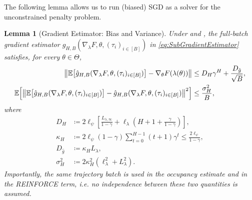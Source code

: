 \documentclass{article}
\theoremstyle{plain}
\newtheorem{lemma}[theorem]{Lemma}
\theoremstyle{definition}
\theoremstyle{remark}
\newcommand{\Exp}[1]{{ \mathbb{E}}\!\left[#1\right]}
\DeclarePairedDelimiter{\norm}{\lVert}{\rVert}
\newcommand{\define}{\coloneqq}
\newcommand{\setm}[1]{[#1]}
\def\gApprox{{\hat{g}}}
\begin{document}
The following lemma allows us to run (biased) SGD as a solver for the
unconstrained penalty problem.
\begin{lemma}[Gradient Estimator: Bias and Variance]
 \label{lem:BiasVarianceGradientEstimator}
 Under  and , the full-batch
 gradient estimator
 $\gApprox_{H,B}(\nabla_\lambda F, \theta,
  (\tau_i)_{i\in\setm{B}})$ in \eqref{eq:SubGradientEstimator} satisfies,
 for every $\theta\in\Theta$,
 \begin{align*}
  \norm*{\Exp{\gApprox_{H,B}(\nabla_\lambda F,\theta,
   (\tau_i)_{i\in\setm{B}})}-\nabla_\theta F(\lambda(\theta))}
   & \leq D_H\gamma^H+\frac{D_{\gApprox}}{\sqrt B}, \\
  \Exp{\norm*{\Exp{\gApprox_{H,B}(\nabla_\lambda F,\theta,
   (\tau_i)_{i\in\setm{B}})}
   -\gApprox_{H,B}(\nabla_\lambda F,\theta,
   (\tau_i)_{i\in\setm{B}})}^2}
   & \leq\frac{\sigma_H^2}{B},
 \end{align*}
 where
 \begin{align*}
  D_H          & \define 2\ell_\psi\left[
   \frac{L_{\lambda,\infty}}{1-\gamma}
  +\ell_\lambda\left(H+1+\frac{\gamma}{1-\gamma}\right)\right], \\
  \kappa_H     & \define 2\ell_\psi(1-\gamma)
  \sum_{t=0}^{H-1}(t+1)\gamma^t
  \leq\frac{2\ell_\psi}{1-\gamma},                              \\
  D_{\gApprox} & \define\kappa_H L_\lambda,                     \\
  \sigma_H^2   & \define
  2\kappa_H^2\left(\ell_\lambda^2+L_\lambda^2\right).
 \end{align*}
 Importantly, the \emph{same trajectory batch} is used in the occupancy
 estimate and in the REINFORCE term, i.e.
 no independence between these two quantities is assumed.
\end{lemma}
\end{document}
